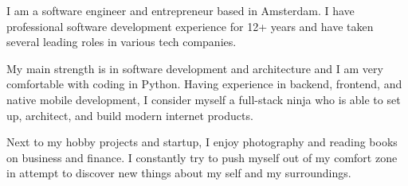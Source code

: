 

\begin{cvparagraph}

I am a software engineer and entrepreneur based in Amsterdam. I have professional software development experience for 12+ years and have taken several leading roles in various tech companies. 

My main strength is in software development and architecture and I am very comfortable with coding in Python. Having experience in backend, frontend, and native mobile development, I consider myself a full-stack ninja who is able to set up, architect, and build modern internet products. 

Next to my hobby projects and startup, I enjoy photography and reading books on business and finance. I constantly try to push myself out of my comfort zone in attempt to discover new things about my self and my surroundings. 

\end{cvparagraph}
